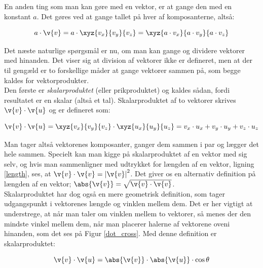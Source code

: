 En anden ting som man kan gøre med en vektor, er at gange den med en konstant $a$. Det gøres ved at gange tallet på hver af komposanterne, altså:

\begin{equation}
a \cdot \v{v} = a \cdot \xyz{v_x}{v_y}{v_z} = \xyz{a \cdot v_x}{a \cdot v_y}{a \cdot v_z}
\end{equation}

\vspace{2mm}

Det næste naturlige spørgsmål er nu, om man kan gange og dividere vektorer med hinanden. Det viser sig at division af vektorer ikke er defineret, men at der til gengæld er to forskellige måder at gange vektorer sammen på, som begge kaldes for vektorprodukter.\\

Den første er \emph{skalarproduktet} (eller prikproduktet) og kaldes sådan, fordi resultatet er en skalar (altså et tal). Skalarproduktet af to vektorer skrives $\v{v} \cdot \v{u}$ og er defineret som:

\begin{equation}
\v{v} \cdot \v{u} = \xyz{v_x}{v_y}{v_z} \cdot \xyz{u_x}{u_y}{u_z}
= v_x \cdot u_x + v_y \cdot u_y + v_z \cdot u_z
\end{equation} 

\vspace{2mm}

Man tager altså vektorenes komposanter, ganger dem sammen i par og lægger det hele sammen. Specielt kan man kigge på skalarproduktet af en vektor med sig selv, og hvis man sammenligner med udtrykket for længden af en vektor, ligning \eqref{length}, ses, at $\v{v} \cdot \v{v} = \left| \v{v} \right|^2$. Det giver os en alternativ definition på længden af en vektor; $\abs{\v{v}} = \sqrt{\v{v} \cdot \v{v}}$.\\ 
Skalarproduktet har dog også en mere geometrisk definition, som tager udgangspunkt i vektorenes længde og vinklen mellem dem. Det er her vigtigt at understrege, at når man taler om vinklen mellem to vektorer, så menes der den mindste vinkel mellem dem, når man placerer halerne af vektorene oveni hinanden, som det ses på Figur \ref{dot_cross}. Med denne definition er skalarproduktet:

\begin{equation}
\v{v} \cdot \v{u} = \abs{\v{v}} \cdot \abs{\v{u}} \cdot \cos \theta
\end{equation} 


\vspace{2mm}

